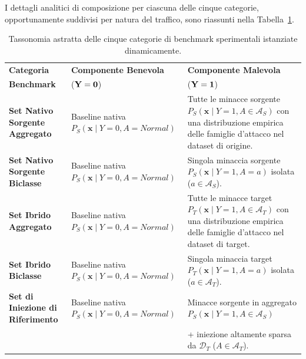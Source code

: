 I dettagli analitici di composizione per ciascuna delle cinque categorie, opportunamente suddivisi per natura del traffico, sono riassunti nella Tabella~\ref{tab:tassonomia_benchmark}.

\begin{table}[H]
    \centering
    \small
    \caption{Tassonomia astratta delle cinque categorie di benchmark sperimentali istanziate dinamicamente.}
    \label{tab:tassonomia_benchmark}
    \begin{tabularx}{\textwidth}{>{\raggedright\arraybackslash}p{3.5cm} >{\raggedright\arraybackslash}X >{\raggedright\arraybackslash}X }
        \toprule
        \textbf{Categoria} & \textbf{Componente Benevola} & \textbf{Componente Malevola} \\[-5pt]
        \textbf{Benchmark} & ($\bf{Y=0}$) & ($\bf{Y = 1}$) \\
        \midrule
        \textbf{Set Nativo Sorgente Aggregato} &
        Baseline nativa $P_S(\mathbf{x} \mid Y=0, A=\textit{Normal})$ &
        Tutte le minacce sorgente $P_S(\mathbf{x} \mid Y=1, A \in \mathcal{A}_S)$ con una distribuzione empirica delle famiglie d'attacco nel dataset di origine. \\
        \addlinespace
        \textbf{Set Nativo Sorgente Biclasse} &
        Baseline nativa $P_S(\mathbf{x} \mid Y=0, A=\textit{Normal})$ &
        Singola minaccia sorgente $P_S(\mathbf{x} \mid Y=1, A = a)$ isolata ($a \in \mathcal{A}_S$). \\
        \addlinespace
        \textbf{Set Ibrido Aggregato} &
        Baseline nativa $P_S(\mathbf{x} \mid Y=0, A=\textit{Normal})$ &
        Tutte le minacce target $P_T(\mathbf{x} \mid Y=1, A \in \mathcal{A}_T)$ con una distribuzione empirica delle famiglie d'attacco nel dataset di target. \\
        \addlinespace
        \textbf{Set Ibrido Biclasse} &
        Baseline nativa $P_S(\mathbf{x} \mid Y=0, A=\textit{Normal})$ &
        Singola minaccia target $P_T(\mathbf{x} \mid Y=1, A = a)$ isolata ($a \in \mathcal{A}_T$). \\
        \addlinespace
        \textbf{Set di Iniezione di Riferimento} &
        Baseline nativa $P_S(\mathbf{x} \mid Y=0, A=\textit{Normal})$ &
        Minacce sorgente in aggregato $P_S(\mathbf{x} \mid Y=1, A \in \mathcal{A}_S)$ \\
        & & + iniezione altamente sparsa da $\mathcal{D}_T$ ($A \in \mathcal{A}_T$). \\
        \bottomrule
    \end{tabularx}
\end{table}

